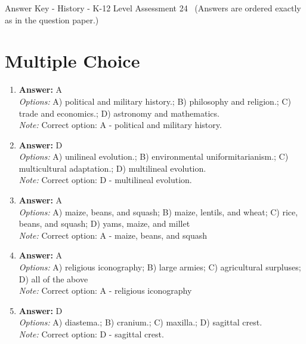 \documentclass[12pt]{article}
\begin{document}
\begin{center}
Answer Key - History - K-12 Level Assessment 24 \
\small (Answers are ordered exactly as in the question paper.)
\end{center}

\section*{Multiple Choice}
\begin{enumerate}[label=\arabic*.]
\item \textbf{Answer:} A
\\ \textit{Options:} A) political and military history.; B) philosophy and religion.; C) trade and economics.; D) astronomy and mathematics.
\\ \textit{Note:} Correct option: A - political and military history.
\item \textbf{Answer:} D
\\ \textit{Options:} A) unilineal evolution.; B) environmental uniformitarianism.; C) multicultural adaptation.; D) multilineal evolution.
\\ \textit{Note:} Correct option: D - multilineal evolution.
\item \textbf{Answer:} A
\\ \textit{Options:} A) maize, beans, and squash; B) maize, lentils, and wheat; C) rice, beans, and squash; D) yams, maize, and millet
\\ \textit{Note:} Correct option: A - maize, beans, and squash
\item \textbf{Answer:} A
\\ \textit{Options:} A) religious iconography; B) large armies; C) agricultural surpluses; D) all of the above
\\ \textit{Note:} Correct option: A - religious iconography
\item \textbf{Answer:} D
\\ \textit{Options:} A) diastema.; B) cranium.; C) maxilla.; D) sagittal crest.
\\ \textit{Note:} Correct option: D - sagittal crest.
\end{enumerate}
\end{document}
